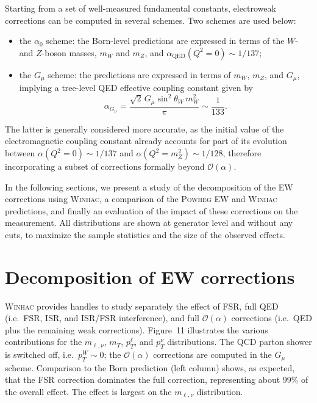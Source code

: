 Starting from a set of well-measured fundamental constants, electroweak
corrections can be computed in several schemes. Two schemes are used below:
\begin{itemize}
  \item the $\alpha_0$ scheme: the Born-level predictions are expressed in
  terms of the $W$- and $Z$-boson masses, $m_W$ and $m_Z$, and
  $\alpha_{\mathrm{QED}}(Q^2=0)\sim 1/137$;

  \item the $G_\mu$ scheme: the predictions are expressed in terms of $m_W$,
  $m_Z$, and $G_\mu$, implying a tree-level QED effective coupling constant
  given by
  \begin{equation}
    \alpha_{G_\mu}
    = \frac{\sqrt{2}\,G_\mu \sin^2\theta_W\,m_W^2}{\pi}
    \sim \frac{1}{133}.
  \end{equation}
\end{itemize}

The latter is generally considered more accurate, as the initial value of the
electromagnetic coupling constant already accounts for part of its evolution
between $\alpha(Q^2=0)\sim 1/137$ and $\alpha(Q^2=m_Z^2)\sim 1/128$, therefore
incorporating a subset of corrections formally beyond
$\mathcal{O}(\alpha)$.

In the following sections, we present a study of the decomposition of the EW
corrections using \textsc{Winhac}, a comparison of the \textsc{Powheg} EW and \textsc{Winhac}
predictions, and finally an evaluation of the impact of these corrections on
the measurement. All distributions are shown at generator level and without
any cuts, to maximize the sample statistics and the size of the observed
effects.



\section{Decomposition of EW corrections}

\textsc{Winhac} provides handles to study separately the effect of FSR, full QED
(i.e.\ FSR, ISR, and ISR/FSR interference), and full
$\mathcal{O}(\alpha)$ corrections (i.e.\ QED plus the remaining weak
corrections). Figure~11 illustrates the various contributions for the
$m_{\ell,\nu}$, $m_T$, $p_T^\ell$, and $p_T^\nu$ distributions. The QCD
parton shower is switched off, i.e.\ $p_T^W\sim 0$; the
$\mathcal{O}(\alpha)$ corrections are computed in the $G_\mu$ scheme.
Comparison to the Born prediction (left column) shows, as expected, that the
FSR correction dominates the full correction, representing about 99\% of the
overall effect. The effect is largest on the $m_{\ell,\nu}$ distribution.

